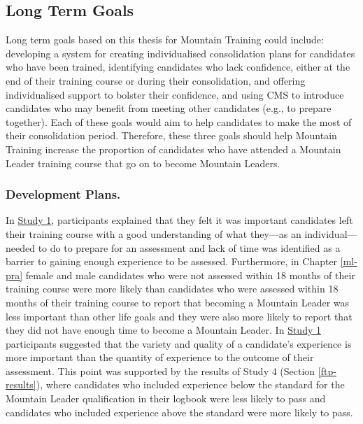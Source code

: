 \documentclass[
  12pt,
  a4paper,
]{book}
\begin{document}
\hypertarget{long-term-goals}{%
\subsection{Long Term Goals}\label{long-term-goals}}

Long term goals based on this thesis for Mountain Training could include: developing a system for creating individualised consolidation plans for candidates who have been trained, identifying candidates who lack confidence, either at the end of their training course or during their consolidation, and offering individualised support to bolster their confidence, and using CMS to introduce candidates who may benefit from meeting other candidates (e.g., to prepare together). Each of these goals would aim to help candidates to make the most of their consolidation period. Therefore, these three goals should help Mountain Training increase the proportion of candidates who have attended a Mountain Leader training course that go on to become Mountain Leaders.

\hypertarget{development-plans.}{%
\subsubsection{Development Plans.}\label{development-plans.}}

In \protect\hyperlink{ml-qualitative}{Study 1}, participants explained that they felt it was important candidates left their training course with a good understanding of what they---as an individual---needed to do to prepare for an assessment and lack of time was identified as a barrier to gaining enough experience to be assessed. Furthermore, in Chapter \ref{ml-pra} female and male candidates who were not assessed within 18 months of their training course were more likely than candidates who were assessed within 18 months of their training course to report that becoming a Mountain Leader was less important than other life goals and they were also more likely to report that they did not have enough time to become a Mountain Leader. In \protect\hyperlink{ml-qualitative}{Study 1} participants suggested that the variety and quality of a candidate's experience is more important than the quantity of experience to the outcome of their assessment. This point was supported by the results of Study 4 (Section \ref{ftp-results}), where candidates who included experience below the standard for the Mountain Leader qualification in their logbook were less likely to pass and candidates who included experience above the standard were more likely to pass.
\end{document}
